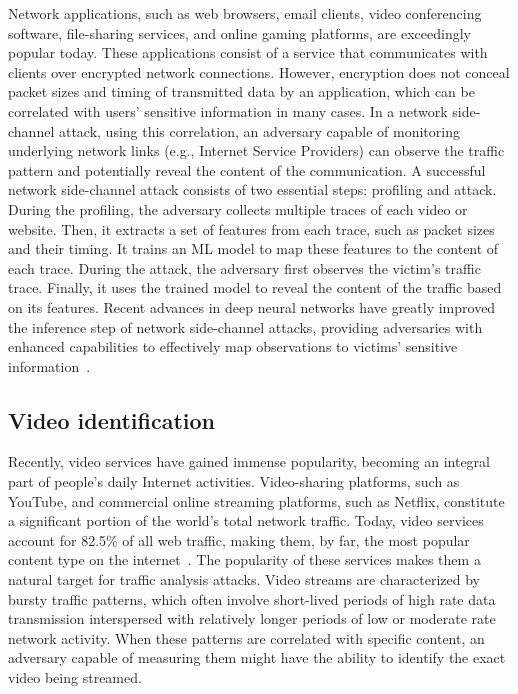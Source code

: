 Network applications, such as web browsers, email clients, video conferencing software, file-sharing services, and online gaming platforms, are exceedingly popular today.
These applications consist of a service that communicates with clients over encrypted network connections.
However, encryption does not conceal packet sizes and timing of transmitted data by an application, which can be correlated with users' sensitive information in many cases.
In a network side-channel attack, using this correlation, an adversary capable of monitoring underlying network links (e.g., Internet Service Providers) can observe the traffic pattern and potentially reveal the content of the communication.
A successful network side-channel attack consists of two essential steps: profiling and attack.
During the profiling, the adversary collects multiple traces of each video or website. 
Then, it extracts a set of features from each trace, such as packet sizes and their timing.
It trains an ML model to map these features to the content of each trace.
During the attack, the adversary first observes the victim's traffic trace. 
Finally, it uses the trained model to reveal the content of the traffic based on its features.
Recent advances in deep neural networks have greatly improved the inference step of network side-channel attacks, providing adversaries with enhanced capabilities to effectively map observations to victims' sensitive information~\cite{schuster2017beautyburst, bhat2019varcnn, hayes2016kfp, sirinam2018df}.



\subsection{Video identification}\label{subsec:video-classification}
Recently, video services have gained immense popularity, becoming an integral part of people's daily Internet activities.
Video-sharing platforms, such as YouTube, and commercial online streaming platforms, such as Netflix, constitute a significant portion of the world's total network traffic.
Today, video services account for 82.5\% of all web traffic, making them, by far, the most popular content type on the internet~\cite{webstat}.
The popularity of these services makes them a natural target for traffic analysis attacks.
Video streams are characterized by bursty traffic patterns, which often involve short-lived periods of high rate data transmission interspersed with relatively longer periods of low or moderate rate network activity.
When these patterns are correlated with specific content, an adversary capable of measuring them might have the ability to identify the exact video being streamed.

